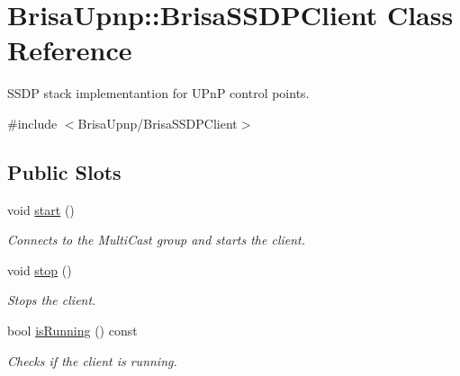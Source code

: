 \hypertarget{classBrisaUpnp_1_1BrisaSSDPClient}{
\section{BrisaUpnp::BrisaSSDPClient Class Reference}
\label{classBrisaUpnp_1_1BrisaSSDPClient}
}


SSDP stack implementantion for UPnP control points.  


{\ttfamily \#include $<$BrisaUpnp/BrisaSSDPClient$>$}\subsection*{Public Slots}
\begin{DoxyCompactItemize}
\item 
void \hyperlink{classBrisaUpnp_1_1BrisaSSDPClient_a4cbb8b895e02598ad9a812822240b455}{start} ()
\begin{DoxyCompactList}\small\item\em Connects to the MultiCast group and starts the client. \item\end{DoxyCompactList}\item 
void \hyperlink{classBrisaUpnp_1_1BrisaSSDPClient_aea1fe16f28140943d0abfd464b42a8b9}{stop} ()
\begin{DoxyCompactList}\small\item\em Stops the client. \item\end{DoxyCompactList}\item 
bool \hyperlink{classBrisaUpnp_1_1BrisaSSDPClient_ae2aebc6140ce5e88172f42c0c6958922}{isRunning} () const 
\begin{DoxyCompactList}\small\item\em Checks if the client is running. \item\end{DoxyCompactList}\end{DoxyCompactItemize}
